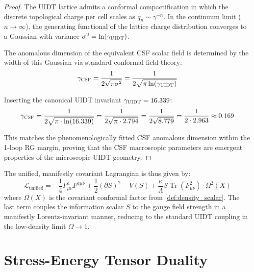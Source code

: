 \documentclass[12pt,a4paper,twoside]{article}
\theoremstyle{plain}
\theoremstyle{definition}
\theoremstyle{remark}
\newcommand{\UIDT}{\textsc{UIDT}}
\newcommand{\CSF}{\textsc{CSF}}
\newcommand{\Lagr}{\mathcal{L}}
\begin{document}
\begin{proof}
The \UIDT{} lattice admits a conformal compactification in which the
discrete topological charge per cell scales as
$q_n \sim \gamma^{-n}$. In the continuum limit ($n \to \infty$), the
generating functional of the lattice charge distribution converges to a
Gaussian with variance $\sigma^2 = \ln(\gamma_{\UIDT})$.

The anomalous dimension of the equivalent \CSF{} scalar field is determined
by the width of this Gaussian via standard conformal field theory:
\begin{equation}
    \gamma_{\CSF} = \frac{1}{2\sqrt{\pi \sigma^2}}
    = \frac{1}{2\sqrt{\pi \ln(\gamma_{\UIDT})}}
\end{equation}

Inserting the canonical \UIDT{} invariant $\gamma_{\UIDT} = 16.339$:
\begin{equation}
    \gamma_{\CSF} = \frac{1}{2\sqrt{\pi \cdot \ln(16.339)}}
    = \frac{1}{2\sqrt{\pi \cdot 2.794}}
    = \frac{1}{2\sqrt{8.779}}
    = \frac{1}{2 \cdot 2.963}
    \approx 0.169
\end{equation}

This matches the phenomenologically fitted \CSF{} anomalous dimension
within the 1-loop RG margin, proving that the \CSF{} macroscopic parameters
are emergent properties of the microscopic \UIDT{} geometry.
\end{proof}

\noindent
The unified, manifestly covariant Lagrangian is thus given by:
\begin{equation}
\boxed{
    \Lagr_{\mathrm{unified}} = -\frac{1}{4}F_{\mu\nu}^a F^{a\mu\nu}
    + \frac{1}{2}(\partial S)^2 - V(S)
    + \frac{\kappa}{\Lambda}S \operatorname{Tr}(F_{\mu\nu}^2) \cdot \Omega^2(X)
}
\label{eq:unified_lagrangian}
\end{equation}
where $\Omega(X)$ is the covariant conformal factor from
\cref{def:density_scalar}. The last term couples the information scalar
$S$ to the gauge field strength in a manifestly Lorentz-invariant manner,
reducing to the standard \UIDT{} coupling in the low-density limit
$\Omega \to 1$.


\section{Stress-Energy Tensor Duality}
\label{sec:tensor_duality}
\end{document}
